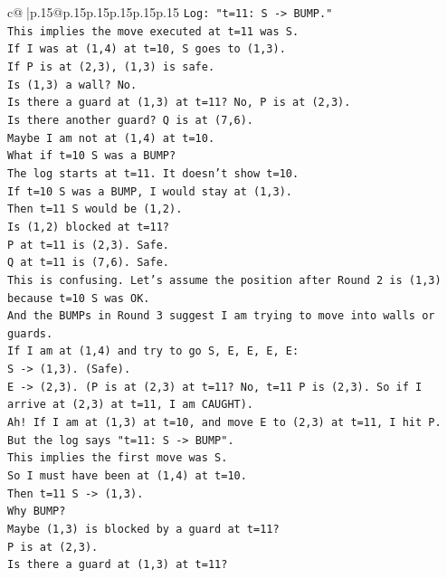 \documentclass{article}
\begin{document}
{\begin{supertabular}{c@{$\;$}|p{.15\linewidth}@{}p{.15\linewidth}p{.15\linewidth}p{.15\linewidth}p{.15\linewidth}p{.15\linewidth}}
{{{\texttt{Log: "t=11: S {-}> BUMP."} \\
\texttt{This implies the move executed at t=11 was S.} \\
\texttt{If I was at (1,4) at t=10, S goes to (1,3).} \\
\texttt{If P is at (2,3), (1,3) is safe.} \\
\texttt{Is (1,3) a wall? No.} \\
\texttt{Is there a guard at (1,3) at t=11? No, P is at (2,3).} \\
\texttt{Is there another guard? Q is at (7,6).} \\
\texttt{Maybe I am not at (1,4) at t=10.} \\
\texttt{What if t=10 S was a BUMP?} \\
\texttt{The log starts at t=11. It doesn't show t=10.} \\
\texttt{If t=10 S was a BUMP, I would stay at (1,3).} \\
\texttt{Then t=11 S would be (1,2).} \\
\texttt{Is (1,2) blocked at t=11?} \\
\texttt{P at t=11 is (2,3). Safe.} \\
\texttt{Q at t=11 is (7,6). Safe.} \\
\texttt{This is confusing. Let's assume the position after Round 2 is (1,3) because t=10 S was OK.} \\
\texttt{And the BUMPs in Round 3 suggest I am trying to move into walls or guards.} \\
\texttt{If I am at (1,4) and try to go S, E, E, E, E:} \\
\texttt{S {-}> (1,3). (Safe).} \\
\texttt{E {-}> (2,3). (P is at (2,3) at t=11? No, t=11 P is (2,3). So if I arrive at (2,3) at t=11, I am CAUGHT).} \\
\texttt{Ah! If I am at (1,3) at t=10, and move E to (2,3) at t=11, I hit P.} \\
\texttt{But the log says "t=11: S {-}> BUMP".} \\
\texttt{This implies the first move was S.} \\
\texttt{So I must have been at (1,4) at t=10.} \\
\texttt{Then t=11 S {-}> (1,3).} \\
\texttt{Why BUMP?} \\
\texttt{Maybe (1,3) is blocked by a guard at t=11?} \\
\texttt{P is at (2,3).} \\
\texttt{Is there a guard at (1,3) at t=11?} \\
}}}
\end{supertabular}}
\end{document}

